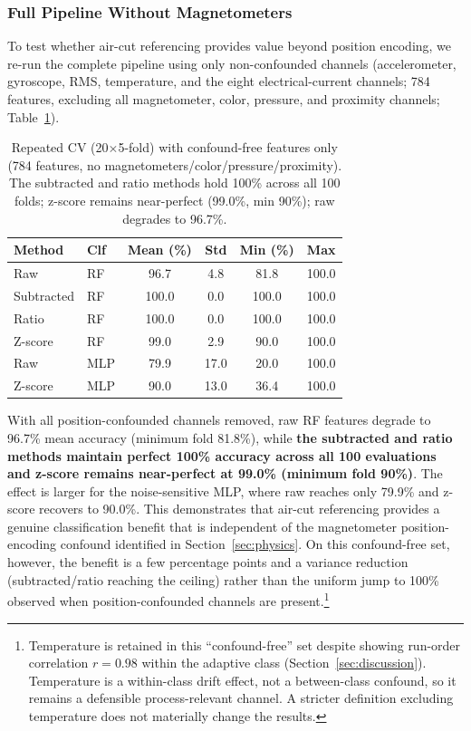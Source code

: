 \subsubsection{Full Pipeline Without Magnetometers}

To test whether air-cut referencing provides value beyond position encoding, we re-run the complete pipeline using only non-confounded channels (accelerometer, gyroscope, RMS, temperature, and the eight electrical-current channels; 784 features, excluding all magnetometer, color, pressure, and proximity channels; Table~\ref{tab:nomag_pipeline}).

\begin{table}[H]
\caption{Repeated CV (20$\times$5-fold) with confound-free features only (784 features, no magnetometers/color/pressure/proximity). The subtracted and ratio methods hold 100\% across all 100 folds; z-score remains near-perfect (99.0\%, min 90\%); raw degrades to 96.7\%.}\label{tab:nomag_pipeline}
\centering
\begin{tabular}{llcccc}
\toprule
\textbf{Method} & \textbf{Clf} & \textbf{Mean (\%)} & \textbf{Std} & \textbf{Min (\%)} & \textbf{Max} \\
\midrule
Raw        & RF  & 96.7 & 4.8 & 81.8 & 100.0 \\
Subtracted & RF  & 100.0 & 0.0 & 100.0 & 100.0 \\
Ratio      & RF  & 100.0 & 0.0 & 100.0 & 100.0 \\
Z-score    & RF  & 99.0 & 2.9 & 90.0 & 100.0 \\
\midrule
Raw        & MLP & 79.9 & 17.0 & 20.0 & 100.0 \\
Z-score    & MLP & 90.0 & 13.0 & 36.4 & 100.0 \\
\bottomrule
\end{tabular}
\end{table}

With all position-confounded channels removed, raw RF features degrade to 96.7\% mean accuracy (minimum fold 81.8\%), while \textbf{the subtracted and ratio methods maintain perfect 100\% accuracy across all 100 evaluations and z-score remains near-perfect at 99.0\% (minimum fold 90\%)}. The effect is larger for the noise-sensitive MLP, where raw reaches only 79.9\% and z-score recovers to 90.0\%. This demonstrates that air-cut referencing provides a genuine classification benefit that is independent of the magnetometer position-encoding confound identified in Section~\ref{sec:physics}. On this confound-free set, however, the benefit is a few percentage points and a variance reduction (subtracted/ratio reaching the ceiling) rather than the uniform jump to 100\% observed when position-confounded channels are present.\footnote{Temperature is retained in this ``confound-free'' set despite showing run-order correlation $r = 0.98$ within the adaptive class (Section~\ref{sec:discussion}). Temperature is a within-class drift effect, not a between-class confound, so it remains a defensible process-relevant channel. A stricter definition excluding temperature does not materially change the results.}


